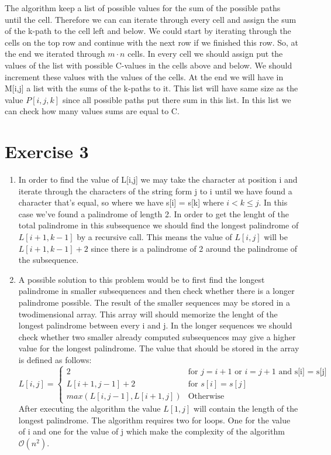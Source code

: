 \documentclass{article}
\newcommand{\bigO}{\mathcal{O}}
\begin{document}
\begin{enumerate}[label= \alph* )]
The algorithm keep a list of possible values for the sum of the possible paths until the cell. Therefore we can can iterate through every cell and assign the sum of the k-path to the cell left and below. We could start by iterating through the cells on the top row and continue with the next row if we finished this row. So, at the end we iterated through $m \cdot n$ cells. In every cell we should assign put the values of the list with possible C-values in the cells above and below. We should increment these values with the values of the cells. At the end we will have in M[i,j] a list with the sums of the k-paths to it. This list will have same size as the value $P[i, j, k]$ since all possible paths put there sum in this list. In this list we can check how many values sums are equal to C.
\end{enumerate}

\newpage
\section*{Exercise 3}
\begin{enumerate}[label= \alph* )]
  \item In order to find the value of L[i,j] we may take the character at position i and iterate through the characters of the string form j to i until we have found a character that's equal, so where we have s[i] = s[k] where $i < k \leq j$. In this case we've found a palindrome of length 2. In order to get the lenght of the total palindrome in this subsequence we should find the longest palindrome of $L[i + 1, k - 1]$ by a recursive call. This means the value of $L[i, j]$ will be $L[i + 1, k - 1] + 2$ since there is a palindrome of 2 around the palindrome of the subsequence.
  \item
  A possible solution to this problem would be to first find the longest palindrome in smaller subsequences and then check whether there is a longer palindrome possible. The result of the smaller sequences may be stored in a twodimensional array. This array will should memorize the lenght of the longest palindrome between every i and j. In the longer sequences we should check whether two smaller already computed subsequences may give a higher value for the longest palindrome. The value that should be stored in the array is defined as follows:
  \[
      L[i,j] = \left\{\begin{array}{lr}
          2 & \text{for } j = i + 1 \text{ or }  i = j + 1 \text{ and s[i] = s[j]} \\
          L[i + 1,j - 1] + 2 & \text{for } s[i] = s[j] \\
          max(L[ i,j-1], L[i+1, j]) & \text{Otherwise}
          \end{array}\right.
    \]
After executing the algorithm the value $L[1, j]$ will contain the length of the longest palindrome. The algorithm requires two for loops. One for the value of i and one for the value of j which make the complexity of the algorithm $\bigO (n^2)$.
\end{enumerate}
\end{document}
